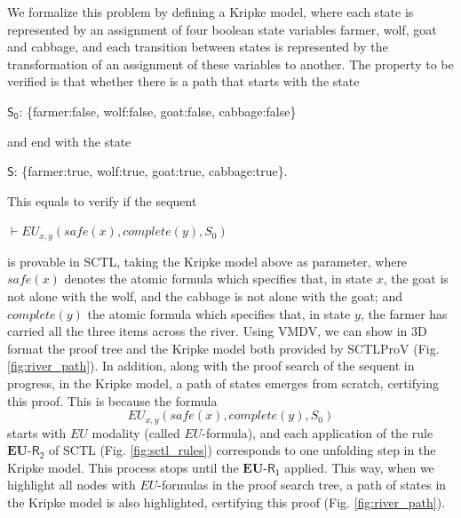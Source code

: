 \documentclass[runningheads]{llncs}
\begin{document}
We formalize this problem by defining a Kripke model,
where each state is represented by an assignment of four boolean state variables \textsf{farmer}, \textsf{wolf}, \textsf{goat} and \textsf{cabbage}, and
each transition between states is represented by the transformation of an assignment of these variables to another.
The property to be verified is that whether there is a path that starts with the state
\begin{center}
$\mathsf{S_0}$: \textsf{\{farmer:false, wolf:false, goat:false, cabbage:false\}}
\end{center}
and end with the state
\begin{center}
$\mathsf{S}$: \textsf{\{farmer:true, wolf:true, goat:true, cabbage:true\}}.
\end{center}
This equals to verify if the sequent \begin{center}
$\vdash EU_{x,y}(safe(x), complete(y), S_0)$
\end{center} is provable in \textsf{SCTL}, taking the Kripke model above as parameter, where $safe(x)$ denotes the atomic formula which specifies that, in state $x$, the goat is not alone with the wolf, and the cabbage is not alone with the goat; and $complete(y)$ the atomic formula which specifies that, in state $y$, the farmer has carried all the three items across the river. Using \textsf{VMDV}, we can show in 3D format the proof tree and the Kripke model both provided by \textsf{SCTLProV} (Fig. \ref{fig:river_path}).
In addition, along with the proof search of the sequent in progress,
in the Kripke model, a path of states emerges from scratch, certifying this proof.
This is because the formula
$$EU_{x,y}(safe(x), complete(y), S_0)$$
starts with $EU$ modality (called $EU$-formula),
and each application of the rule $\mathbf{EU}$-$\mathsf{R_2}$ of \textsf{SCTL} (Fig. \ref{fig:sctl_rules})
corresponds to one unfolding step in the Kripke model. This process stops until the $\mathbf{EU}$-$\mathsf{R_1}$ applied.
This way, when we highlight all nodes with $EU$-formulas in the proof search tree, 
a path of states in the Kripke model is also highlighted, certifying this proof (Fig. \ref{fig:river_path}).
\end{document}
